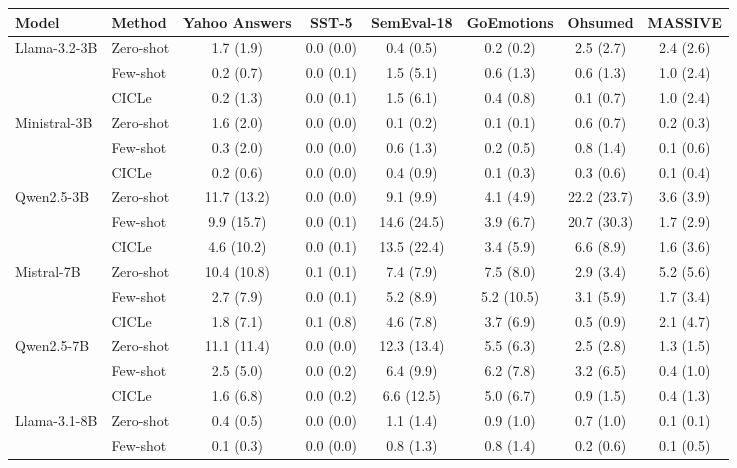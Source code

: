 \begin{tabular}{llcccccc}
\toprule
Model & Method & Yahoo Answers & SST-5 & SemEval-18 & GoEmotions & Ohsumed & MASSIVE \\
\midrule
Llama-3.2-3B & Zero-shot & 1.7 (1.9) & 0.0 (0.0) & 0.4 (0.5) & 0.2 (0.2) & 2.5 (2.7) & 2.4 (2.6) \\
 & Few-shot & 0.2 (0.7) & 0.0 (0.1) & 1.5 (5.1) & 0.6 (1.3) & 0.6 (1.3) & 1.0 (2.4) \\
 & CICLe & 0.2 (1.3) & 0.0 (0.1) & 1.5 (6.1) & 0.4 (0.8) & 0.1 (0.7) & 1.0 (2.4) \\
\addlinespace
Ministral-3B & Zero-shot & 1.6 (2.0) & 0.0 (0.0) & 0.1 (0.2) & 0.1 (0.1) & 0.6 (0.7) & 0.2 (0.3) \\
 & Few-shot & 0.3 (2.0) & 0.0 (0.0) & 0.6 (1.3) & 0.2 (0.5) & 0.8 (1.4) & 0.1 (0.6) \\
 & CICLe & 0.2 (0.6) & 0.0 (0.0) & 0.4 (0.9) & 0.1 (0.3) & 0.3 (0.6) & 0.1 (0.4) \\
\addlinespace
Qwen2.5-3B & Zero-shot & 11.7 (13.2) & 0.0 (0.0) & 9.1 (9.9) & 4.1 (4.9) & 22.2 (23.7) & 3.6 (3.9) \\
 & Few-shot & 9.9 (15.7) & 0.0 (0.1) & 14.6 (24.5) & 3.9 (6.7) & 20.7 (30.3) & 1.7 (2.9) \\
 & CICLe & 4.6 (10.2) & 0.0 (0.1) & 13.5 (22.4) & 3.4 (5.9) & 6.6 (8.9) & 1.6 (3.6) \\
\addlinespace
Mistral-7B & Zero-shot & 10.4 (10.8) & 0.1 (0.1) & 7.4 (7.9) & 7.5 (8.0) & 2.9 (3.4) & 5.2 (5.6) \\
 & Few-shot & 2.7 (7.9) & 0.0 (0.1) & 5.2 (8.9) & 5.2 (10.5) & 3.1 (5.9) & 1.7 (3.4) \\
 & CICLe & 1.8 (7.1) & 0.1 (0.8) & 4.6 (7.8) & 3.7 (6.9) & 0.5 (0.9) & 2.1 (4.7) \\
\addlinespace
Qwen2.5-7B & Zero-shot & 11.1 (11.4) & 0.0 (0.0) & 12.3 (13.4) & 5.5 (6.3) & 2.5 (2.8) & 1.3 (1.5) \\
 & Few-shot & 2.5 (5.0) & 0.0 (0.2) & 6.4 (9.9) & 6.2 (7.8) & 3.2 (6.5) & 0.4 (1.0) \\
 & CICLe & 1.6 (6.8) & 0.0 (0.2) & 6.6 (12.5) & 5.0 (6.7) & 0.9 (1.5) & 0.4 (1.3) \\
\addlinespace
Llama-3.1-8B & Zero-shot & 0.4 (0.5) & 0.0 (0.0) & 1.1 (1.4) & 0.9 (1.0) & 0.7 (1.0) & 0.1 (0.1) \\
 & Few-shot & 0.1 (0.3) & 0.0 (0.0) & 0.8 (1.3) & 0.8 (1.4) & 0.2 (0.6) & 0.1 (0.5) \\

\end{tabular}
